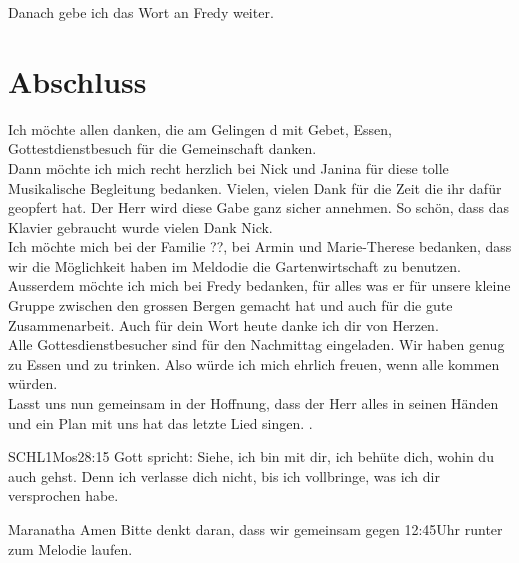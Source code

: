 \documentclass{../../inc/mybib}
\begin{document}
Danach gebe ich das Wort an Fredy weiter.








\section{Abschluss}

Ich möchte allen danken, die am Gelingen d
mit Gebet, Essen, Gottestdienstbesuch für die Gemeinschaft danken.\\
Dann möchte ich mich recht herzlich bei Nick und Janina für diese tolle Musikalische Begleitung bedanken. Vielen, vielen Dank für die Zeit die ihr dafür geopfert hat. Der Herr wird diese Gabe ganz sicher annehmen. So schön, dass das Klavier gebraucht wurde vielen Dank Nick.\\
Ich möchte mich bei der Familie ??, bei Armin und Marie-Therese bedanken, dass wir die Möglichkeit haben im Meldodie die Gartenwirtschaft zu benutzen.\\
Ausserdem möchte ich mich bei Fredy bedanken, für alles was er für unsere kleine Gruppe zwischen den grossen Bergen gemacht hat und auch für die gute Zusammenarbeit. Auch für dein Wort heute danke ich dir von Herzen.\\
Alle Gottesdienstbesucher sind für den Nachmittag eingeladen. Wir haben genug zu Essen und zu trinken. Also würde ich mich ehrlich freuen, wenn alle kommen würden.\\
Lasst uns nun gemeinsam in der Hoffnung, dass der Herr alles in seinen Händen und ein Plan mit uns hat das letzte Lied singen. .

\beten{}

\begin{bibelbox}{SCHL}{1Mos}{28:15}
    Gott spricht: Siehe, ich bin mit dir,
    ich behüte dich, wohin du auch gehst.
    Denn ich verlasse dich nicht,
    bis ich vollbringe, was ich dir versprochen habe.
\end{bibelbox}

Maranatha Amen
Bitte denkt daran, dass wir gemeinsam gegen 12:45Uhr runter zum Melodie laufen. 
\end{document}
